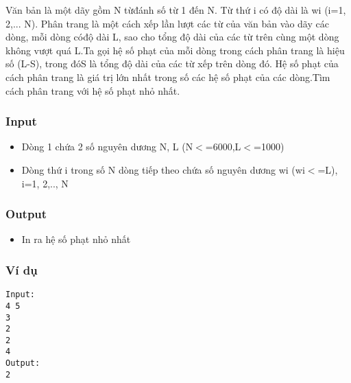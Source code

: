 



   Văn bản là một dãy gồm N từđánh số từ 1 đến N. Từ thứ i có độ dài là wi (i=1, 2,... N). Phân trang là một cách xếp lần lượt các từ của văn bản vào dãy các dòng, mỗi dòng cóđộ dài L, sao cho tổng độ dài của các từ trên cùng một dòng không vượt quá L.Ta gọi hệ số phạt của mỗi dòng trong cách phân trang là hiệu số (L-S), trong đóS là tổng độ dài của các từ xếp trên dòng đó. Hệ số phạt của cách phân trang là giá trị lớn nhất trong số các hệ số phạt của các dòng.Tìm cách phân trang với hệ số phạt nhỏ nhất.  

\subsubsection{   Input  }
\begin{itemize}
	\item     Dòng 1 chứa 2 số nguyên dương N, L (N$<$=6000,L$<$=1000)   
	\item     Dòng thứ i trong số N dòng tiếp theo chứa số nguyên dương wi (wi$<$=L), i=1, 2,.., N   
\end{itemize}

\subsubsection{   Output  }
\begin{itemize}
	\item     In ra hệ số phạt nhỏ nhất   
\end{itemize}

\subsubsection{   Ví dụ  }
\begin{verbatim}
Input:
4 5
3
2
2
4
Output:
2 
\end{verbatim}